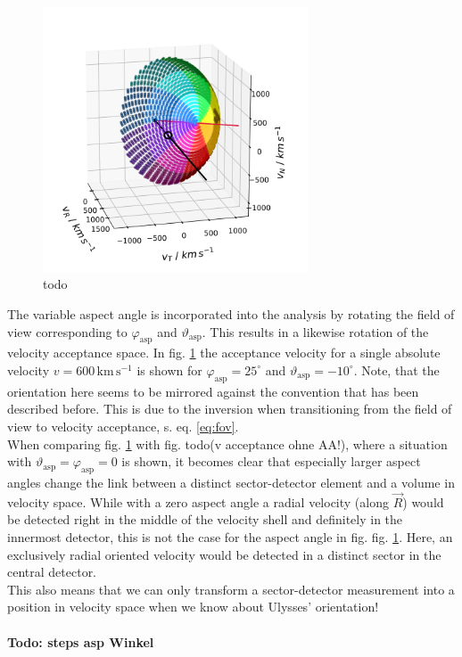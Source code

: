 \begin{figure}[h]
	\includegraphics[width=0.7\textwidth]{Figures/col_aa_marker.png}
	\centering
	\caption{todo}
	\label{fig:col_aa}
\end{figure}
%
%
%
The variable aspect angle is incorporated into the analysis by rotating the field of view corresponding to $\varphi_{\mathrm{asp}}$ and $\vartheta_{\mathrm{asp}}$. This results in a likewise rotation of the velocity acceptance space. In fig. \ref{fig:col_aa} the acceptance velocity for a single absolute velocity $v = 600\,\mathrm{km\,s^{-1}}$ is shown for $\varphi_\mathrm{asp} = 25^\circ$ and $\vartheta_{\mathrm{asp}} = -10^\circ $. Note, that the orientation here seems to be mirrored against the convention that has been described before. This is due to the inversion when transitioning from the field of view to velocity acceptance, s. eq. \ref{eq:fov}.\\
When comparing fig. \ref{fig:col_aa} with fig. todo(v acceptance ohne AA!), where a situation with $\vartheta_{\mathrm{asp}} = \varphi_{\mathrm{asp}} = 0$ is shown, it becomes clear that especially larger aspect angles change the link between a distinct sector-detector element and a volume in velocity space. While with a zero aspect angle a radial velocity (along $\vec{R}$) would be detected right in the middle of the velocity shell and definitely in the innermost detector, this is not the case for the aspect angle in fig. fig. \ref{fig:col_aa}. Here, an exclusively radial oriented velocity would be detected in a distinct sector in the central detector.\\
This also means that we can only transform a sector-detector measurement into a position in velocity space when we know about Ulysses' orientation!
\\ \\
\textbf{Todo: steps asp Winkel}
